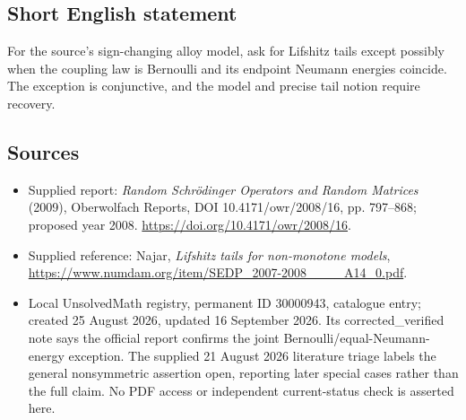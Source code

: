 \documentclass[11pt]{article}
\begin{document}
\subsection{Short English statement}
For the source's sign-changing alloy model, ask for Lifshitz tails except possibly when the coupling law is Bernoulli and its endpoint Neumann energies coincide. The exception is conjunctive, and the model and precise tail notion require recovery.
\subsection{Sources}
\begin{itemize}
\item Supplied report: \emph{Random Schrödinger Operators and Random Matrices} (2009), Oberwolfach Reports, DOI 10.4171/owr/2008/16, pp. 797--868; proposed year 2008. \url{https://doi.org/10.4171/owr/2008/16}.
\item Supplied reference: Najar, \emph{Lifshitz tails for non-monotone models}, \url{https://www.numdam.org/item/SEDP_2007-2008____A14_0.pdf}.
\item Local UnsolvedMath registry, permanent ID 30000943, catalogue entry; created 25 August 2026, updated 16 September 2026. Its corrected\_verified note says the official report confirms the joint Bernoulli/equal-Neumann-energy exception. The supplied 21 August 2026 literature triage labels the general nonsymmetric assertion open, reporting later special cases rather than the full claim. No PDF access or independent current-status check is asserted here.
\end{itemize}
\end{document}
